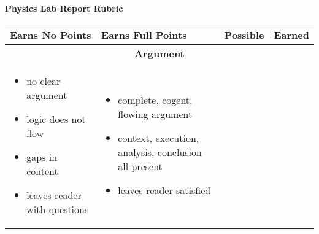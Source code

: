 \documentclass[
    8pt,
    DIV=42,
    BCOR=0mm,
    pagenumber=off,
    paper=5.5in:8.5in,
    pagesize,
]{scrartcl}
\begin{document}
\begin{center}
    \large\bfseries Physics Lab Report Rubric
\end{center}
\hfill\vfill
\begin{tabularx}{\textwidth}{|X|X|m{0.557in}|c|} %
                                                                                                                                                                                                                         \hline
 \centering \textbf{Earns No Points}                                           & \centering \textbf{Earns Full Points}                                            & \centering \textbf{Possible} & \textbf{Earned} \\ \hline
 \multicolumn{4}{|c|}{\textbf{Argument}}                                                                                                                                                                              \\ \hline
 \begin{itemize}[leftmargin=*]
  \item{no clear argument}
  \item{logic does not flow}
  \item{gaps in content}
  \item{leaves reader with questions}
 \end{itemize} &
  \begin{itemize}[leftmargin=*]
\item{complete, cogent, flowing argument}
\item{context, execution, analysis, conclusion all present}
\item{leaves reader satisfied}


\end{itemize}
\end{tabularx}
\end{document}
